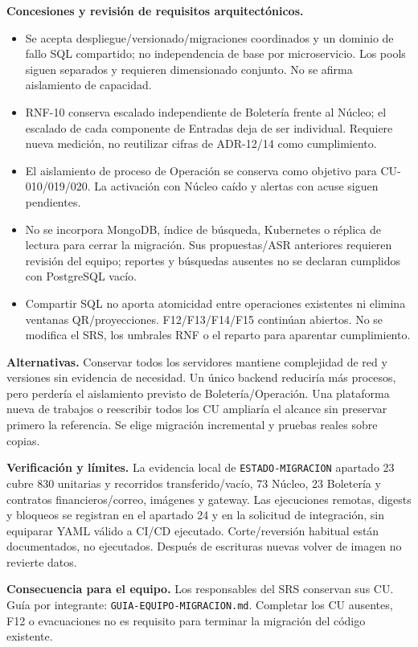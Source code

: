 \textbf{Concesiones y revisión de requisitos arquitectónicos.}
\begin{itemize}
\item Se acepta despliegue/versionado/migraciones coordinados y un dominio de fallo
SQL compartido; no independencia de base por microservicio. Los pools siguen
separados y requieren dimensionado conjunto. No se afirma aislamiento de capacidad.
\item RNF-10 conserva escalado independiente de Boletería frente al Núcleo; el
escalado de cada componente de Entradas deja de ser individual. Requiere nueva
medición, no reutilizar cifras de ADR-12/14 como cumplimiento.
\item El aislamiento de proceso de Operación se conserva como objetivo para
CU-010/019/020. La activación con Núcleo caído y alertas con acuse siguen pendientes.
\item No se incorpora MongoDB, índice de búsqueda, Kubernetes o réplica de lectura
para cerrar la migración. Sus propuestas/ASR anteriores requieren revisión del
equipo; reportes y búsquedas ausentes no se declaran cumplidos con PostgreSQL vacío.
\item Compartir SQL no aporta atomicidad entre operaciones existentes ni elimina
ventanas QR/proyecciones. F12/F13/F14/F15 continúan abiertos. No se modifica el SRS,
los umbrales RNF o el reparto para aparentar cumplimiento.
\end{itemize}

\textbf{Alternativas.} Conservar todos los servidores mantiene complejidad de red y
versiones sin evidencia de necesidad. Un único backend reduciría más procesos,
pero perdería el aislamiento previsto de Boletería/Operación. Una plataforma nueva
de trabajos o reescribir todos los CU ampliaría el alcance sin preservar primero
la referencia. Se elige migración incremental y pruebas reales sobre copias.

\textbf{Verificación y límites.} La evidencia local de \texttt{ESTADO-MIGRACION}
apartado 23 cubre 830 unitarias y recorridos transferido/vacío, 73 Núcleo, 23
Boletería y contratos financieros/correo, imágenes y gateway. Las ejecuciones
remotas, digests y bloqueos se registran en el apartado 24 y en la solicitud de
integración, sin equiparar YAML válido a CI/CD ejecutado. Corte/reversión habitual
están documentados, no ejecutados. Después de escrituras nuevas volver de imagen
no revierte datos.

\textbf{Consecuencia para el equipo.} Los responsables del SRS conservan sus CU.
Guía por integrante: \texttt{GUIA-EQUIPO-MIGRACION.md}. Completar los CU ausentes,
F12 o evacuaciones no es requisito para terminar la migración del código existente.
